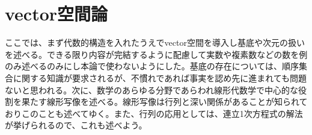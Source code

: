 \documentclass[a4paper]{jsarticle}
\begin{document}
\section{vector空間論}
ここでは、まず代数的構造を入れたうえでvector空間を導入し基底や次元の扱いを述べる。できる限り内容が完結するように配慮して実数や複素数などの数を例のみ述べるのみにし本論で使わないようにした。基底の存在については、順序集合に関する知識が要求されるが、不慣れであれば事実を認め先に進まれても問題ないと思われる。次に、数学のあらゆる分野であらわれ線形代数学で中心的な役割を果たす線形写像を述べる。線形写像は行列と深い関係があることが知られておりこのことも述べてゆく。また、行列の応用としては、連立1次方程式の解法が挙げられるので、これも述べよう。
\end{document}

